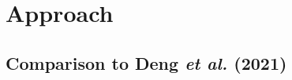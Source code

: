 \documentclass[11pt]{article}
\begin{document}














\section{Approach}
\subsection{Comparison to Deng \emph{et al.} (2021)} %
\end{document}
